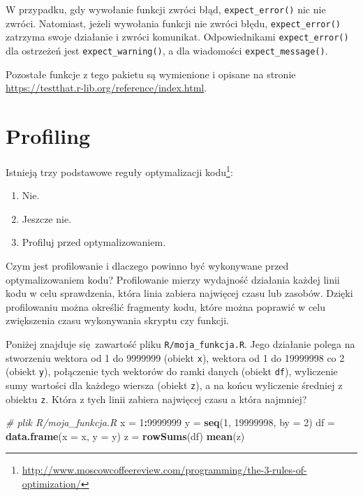 \documentclass[paper=6in:9in,pagesize=pdftex,headinclude=on,footinclude=on,10pt]{scrbook}
\newenvironment{Shaded}{\begin{snugshade}}{\end{snugshade}}
\newcommand{\CommentTok}[1]{\textcolor[rgb]{0.56,0.35,0.01}{\textit{#1}}}
\newcommand{\DataTypeTok}[1]{\textcolor[rgb]{0.13,0.29,0.53}{#1}}
\newcommand{\DecValTok}[1]{\textcolor[rgb]{0.00,0.00,0.81}{#1}}
\newcommand{\KeywordTok}[1]{\textcolor[rgb]{0.13,0.29,0.53}{\textbf{#1}}}
\newcommand{\NormalTok}[1]{#1}
\newcommand{\OperatorTok}[1]{\textcolor[rgb]{0.81,0.36,0.00}{\textbf{#1}}}
\newcommand{\StringTok}[1]{\textcolor[rgb]{0.31,0.60,0.02}{#1}}
\providecommand{\tightlist}{%
  \setlength{\itemsep}{0pt}\setlength{\parskip}{0pt}}
\begin{document}
W przypadku, gdy wywołanie funkcji zwróci błąd, \texttt{expect\_error()} nic nie zwróci.
Natomiast, jeżeli wywołania funkcji nie zwróci błędu, \texttt{expect\_error()} zatrzyma swoje działanie i zwróci komunikat.
Odpowiednikami \texttt{expect\_error()} dla ostrzeżeń jest \texttt{expect\_warning()}, a dla wiadomości \texttt{expect\_message()}.

Pozostałe funkcje z tego pakietu są wymienione i opisane na stronie \url{https://testthat.r-lib.org/reference/index.html}.

\hypertarget{profiling}{%
\section{Profiling}\label{profiling}}

Istnieją trzy podstawowe reguły optymalizacji kodu\footnote{\url{http://www.moscowcoffeereview.com/programming/the-3-rules-of-optimization/}}:

\begin{enumerate}
\def\labelenumi{\arabic{enumi}.}
\tightlist
\item
  Nie.
\item
  Jeszcze nie.
\item
  Profiluj przed optymalizowaniem.
\end{enumerate}

Czym jest profilowanie i dlaczego powinno być wykonywane przed optymalizowaniem kodu?
Profilowanie mierzy wydajność działania każdej linii kodu w celu sprawdzenia, która linia zabiera najwięcej czasu lub zasobów.
Dzięki profilowaniu można określić fragmenty kodu, które można poprawić w celu zwiększenia czasu wykonywania skryptu czy funkcji.

Poniżej znajduje się~zawartość pliku \texttt{R/moja\_funkcja.R}.
Jego działanie polega na stworzeniu wektora od 1 do 9999999 (obiekt \texttt{x}), wektora od 1 do 19999998 co 2 (obiekt \texttt{y}), połączenie tych wektorów do ramki danych (obiekt \texttt{df}), wyliczenie sumy wartości dla każdego wiersza (obiekt \texttt{z}), a na końcu wyliczenie średniej z obiektu \texttt{z}.
Która z tych linii zabiera najwięcej czasu a która najmniej?

\begin{Shaded}
\begin{Highlighting}[]
\CommentTok{# plik R/moja_funkcja.R}
\NormalTok{x =}\StringTok{ }\DecValTok{1}\OperatorTok{:}\DecValTok{9999999}
\NormalTok{y =}\StringTok{ }\KeywordTok{seq}\NormalTok{(}\DecValTok{1}\NormalTok{, }\DecValTok{19999998}\NormalTok{, }\DataTypeTok{by =} \DecValTok{2}\NormalTok{)}
\NormalTok{df =}\StringTok{ }\KeywordTok{data.frame}\NormalTok{(}\DataTypeTok{x =}\NormalTok{ x, }\DataTypeTok{y =}\NormalTok{ y)}
\NormalTok{z =}\StringTok{ }\KeywordTok{rowSums}\NormalTok{(df)}
\KeywordTok{mean}\NormalTok{(z)}
\end{Highlighting}
\end{Shaded}
\end{document}
